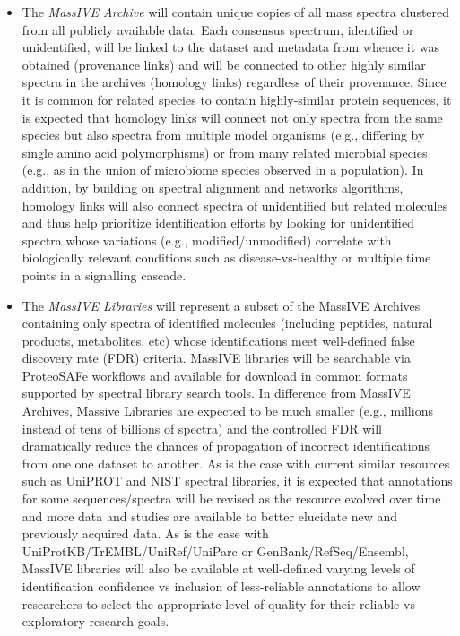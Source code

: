 \documentclass[arial,11pt]{article}
\begin{document}
\begin{itemize}
\item The {\em MassIVE Archive} will contain unique copies of all mass spectra clustered from all publicly available data. Each consensus spectrum, identified or unidentified, will be linked to the dataset and metadata from whence it was obtained (provenance links) and will be connected to other highly similar spectra in the archives (homology links) regardless of their provenance. Since it is common for related species to contain highly-similar protein sequences, it is expected that homology links will connect not only spectra from the same species but also spectra from multiple model organisms (e.g., differing by single amino acid polymorphisms) or from many related microbial species (e.g., as in the union of microbiome species observed in a population). In addition, by building on spectral alignment and networks algorithms, homology links will also connect spectra of unidentified but related molecules and thus help prioritize identification efforts by looking for unidentified spectra whose variations (e.g., modified/unmodified) correlate with biologically relevant conditions such as disease-vs-healthy or multiple time points in a signalling cascade.

\item The {\em MassIVE Libraries} will represent a subset of the MassIVE Archives containing only spectra of identified molecules (including peptides, natural products, metabolites, etc) whose identifications meet well-defined false discovery rate (FDR) criteria. MassIVE libraries will be searchable via ProteoSAFe workflows and available for download in common formats supported by spectral library search tools. In difference from MassIVE Archives, Massive Libraries are expected to be much smaller (e.g., millions instead of tens of billions of spectra) and the controlled FDR will dramatically reduce the chances of propagation of incorrect identifications from one one dataset to another. As is the case with current similar resources such as UniPROT and NIST spectral libraries, it is expected that annotations for some sequences/spectra will be revised as the resource evolved over time and more data and studies are available to better elucidate new and previously acquired data. As is the case with UniProtKB/TrEMBL/UniRef/UniParc or GenBank/RefSeq/Ensembl, MassIVE libraries will also be available at well-defined varying levels of identification confidence vs inclusion of less-reliable annotations to allow researchers to select the appropriate level of quality for their reliable vs exploratory research goals.


\end{itemize}
\end{document}
